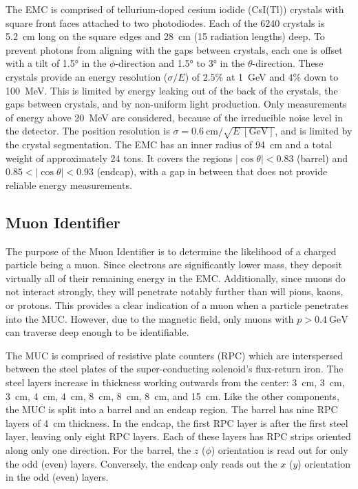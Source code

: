 The EMC is comprised of tellurium-doped cesium iodide (CsI(Tl)) crystals with square front faces attached to two photodiodes.
Each of the 6240 crystals is \SI{5.2}{\cm} long on the square edges and \SI{28}{\cm} (15 radiation lengths) deep.
To prevent photons from aligning with the gaps between crystals, each one is offset with a tilt of \ang{1.5} in the $\phi$-direction and \ang{1.5} to \ang{3} in the $\theta$-direction.
These crystals provide an energy resolution ($\sigma / E$) of $2.5\%$ at \SI{1}{\GeV} and $4\%$ down to \SI{100}{\MeV}.
This is limited by energy leaking out of the back of the crystals, the gaps between crystals, and by non-uniform light production.
Only measurements of energy above \SI{20}{\MeV} are considered, because of the irreducible noise level in the detector.
The position resolution is $\sigma = \SI{0.6}{\cm} / \sqrt{E \; [\si{\GeV}]}$, and is limited by the crystal segmentation.
The EMC has an inner radius of \SI{94}{\cm} and a total weight of approximately 24 tons.
It covers the regions $|\cos\theta| < 0.83$ (barrel) and $0.85 < |\cos\theta| < 0.93$ (endcap), with a gap in between that does not provide reliable energy measurements.


\subsection{Muon Identifier}
\label{ssec:detector_mu}

The purpose of the Muon Identifier is to determine the likelihood of a charged particle being a muon.
Since electrons are significantly lower mass, they deposit virtually all of their remaining energy in the EMC.
Additionally, since muons do not interact strongly, they will penetrate notably further than will pions, kaons, or protons.
This provides a clear indication of a muon when a particle penetrates into the MUC.
However, due to the magnetic field, only muons with $p > \SI{0.4}{\GeV}$ can traverse deep enough to be identifiable.


The MUC is comprised of resistive plate counters (RPC) which are interspersed between the steel plates of the super-conducting solenoid's flux-return iron.
The steel layers increase in thickness working outwards from the center: \SI{3}{\cm}, \SI{3}{\cm}, \SI{3}{\cm}, \SI{4}{\cm}, \SI{4}{\cm}, \SI{8}{\cm}, \SI{8}{\cm}, \SI{8}{\cm}, and \SI{15}{\cm}.
Like the other components, the MUC is split into a barrel and an endcap region.
The barrel has nine RPC layers of \SI{4}{\cm} thickness.
In the endcap, the first RPC layer is after the first steel layer, leaving only eight RPC layers.
Each of these layers has RPC strips oriented along only one direction.
For the barrel, the $z$ ($\phi$) orientation is read out for only the odd (even) layers.
Conversely, the endcap only reads out the $x$ ($y$) orientation in the odd (even) layers.


